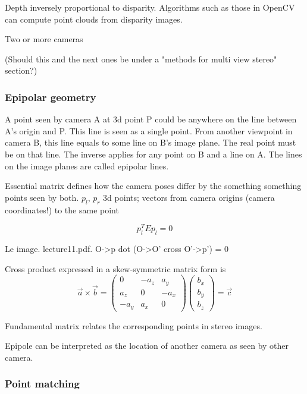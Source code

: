 Depth inversely proportional to disparity. Algorithms such as those in OpenCV can compute point clouds from disparity images.

Two or more cameras

(Should this and the next ones be under a "methods for multi view stereo" section?)

\subsubsection{Epipolar geometry}

A point seen by camera A at 3d point P could be anywhere on the line between A's origin and P.
This line is seen as a single point.
From another viewpoint in camera B, this line equals to some line on B's image plane.
The real point must be on that line.
The inverse applies for any point on B and a line on A.
The lines on the image planes are called epipolar lines.


Essential matrix defines how the camera poses differ by the something something points seen by both. $p_l$, $p_r$ 3d points; vectors from camera origins (camera coordinates!) to the same point

\[
	p_l^T E p_l = 0
\]

Le image. lecture11.pdf. O->p dot (O->O' cross O'->p') = 0

Cross product expressed in a skew-symmetric matrix form is
\begin{equation}
\vec a \times \vec b =
\begin{pmatrix}
	 0   & -a_z &  a_y\\
	 a_z &  0   & -a_x\\
	-a_y &  a_x & 0
\end{pmatrix}
\begin{pmatrix}
	b_x\\b_y\\b_z
\end{pmatrix}
= \vec c
\end{equation}


Fundamental matrix relates the corresponding points in stereo images.

Epipole can be interpreted as the location of another camera as seen by other camera.



\subsubsection{Point matching}

